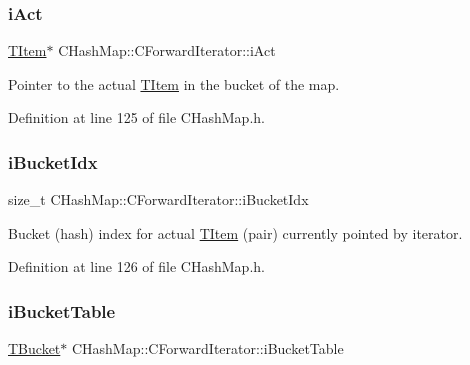 \subsubsection{\texorpdfstring{i\+Act}{iAct}}
{\footnotesize\ttfamily \hyperlink{struct_c_hash_map_1_1_t_item}{T\+Item}$\ast$ C\+Hash\+Map\+::\+C\+Forward\+Iterator\+::i\+Act\hspace{0.3cm}{\ttfamily [private]}}



Pointer to the actual \hyperlink{struct_c_hash_map_1_1_t_item}{T\+Item} in the bucket of the map. 



Definition at line 125 of file C\+Hash\+Map.\+h.

\mbox{\label{class_c_hash_map_1_1_c_forward_iterator_a9639a0361741c7ee2fc7d4eabe525de6}} 
\subsubsection{\texorpdfstring{i\+Bucket\+Idx}{iBucketIdx}}
{\footnotesize\ttfamily size\+\_\+t C\+Hash\+Map\+::\+C\+Forward\+Iterator\+::i\+Bucket\+Idx\hspace{0.3cm}{\ttfamily [private]}}



Bucket (hash) index for actual \hyperlink{struct_c_hash_map_1_1_t_item}{T\+Item} (pair) currently pointed by iterator. 



Definition at line 126 of file C\+Hash\+Map.\+h.

\mbox{\label{class_c_hash_map_1_1_c_forward_iterator_a64aafac64a1196ed4f0c0a08db2d366e}} 
\subsubsection{\texorpdfstring{i\+Bucket\+Table}{iBucketTable}}
{\footnotesize\ttfamily \hyperlink{struct_c_hash_map_1_1_t_bucket}{T\+Bucket}$\ast$ C\+Hash\+Map\+::\+C\+Forward\+Iterator\+::i\+Bucket\+Table\hspace{0.3cm}{\ttfamily [private]}}



